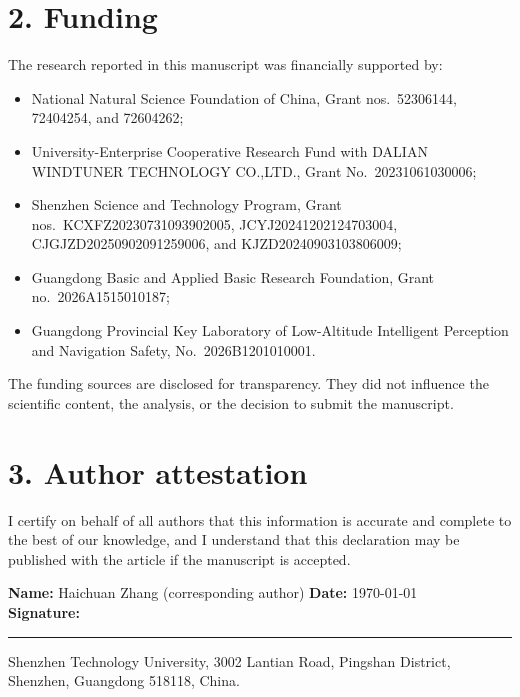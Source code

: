 \documentclass[10pt]{article}
\begin{document}
\section*{2. Funding}

The research reported in this manuscript was financially supported by:

\begin{itemize}
  \raggedright
  \setlength{\itemsep}{2pt}
  \item National Natural Science Foundation of China, Grant nos.\ 52306144, 72404254,
        and 72604262;
  \item University-Enterprise Cooperative Research Fund with DALIAN WINDTUNER
        TECHNOLOGY CO.,LTD., Grant No.\ 20231061030006;
  \item Shenzhen Science and Technology Program, Grant nos.\
        KCXFZ20230731093902005, JCYJ20241202124703004,
        CJGJZD20250902091259006, and KJZD20240903103806009;
  \item Guangdong Basic and Applied Basic Research Foundation, Grant no.\
        2026A1515010187;
  \item Guangdong Provincial Key Laboratory of Low-Altitude Intelligent Perception and
        Navigation Safety, No.\ 2026B1201010001.
\end{itemize}

The funding sources are disclosed for transparency. They did not influence the
scientific content, the analysis, or the decision to submit the manuscript.

\section*{3. Author attestation}

I certify on behalf of all authors that this information is accurate and complete to the
best of our knowledge, and I understand that this declaration may be published with the
article if the manuscript is accepted.

\noindent\textbf{Name:} Haichuan Zhang (corresponding author) \hfill \textbf{Date:} \today\\[12pt]
\noindent\textbf{Signature:} \rule{0.50\textwidth}{0.4pt}

\vspace{0.3em}
\noindent\footnotesize
Shenzhen Technology University, 3002 Lantian Road, Pingshan District, Shenzhen,
Guangdong 518118, China.
\end{document}
